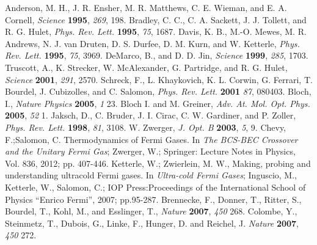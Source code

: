 \documentclass[atoms,article,submit,moreauthors,pdftex,12pt,a4paper]{mdpi}
\begin{document}

\makeatletter
\renewcommand\@biblabel[1]{#1. }
\makeatother
\begin{thebibliography}{999} %
Anderson, M. H., J. R. Ensher, M. R. Matthews, C. E. Wieman, and E. A. Cornell, {\em Science} {\bf 1995}, {\em 269}, 198.
Bradley, C. C., C. A. Sackett, J. J. Tollett, and R. G. Hulet, {\em Phys. Rev. Lett.} {\bf 1995}, {\em 75}, 1687.
Davis, K. B., M.-O. Mewes, M. R. Andrews, N. J. van Druten, D. S. Durfee, D. M. Kurn, and W. Ketterle, {\em Phys. Rev. Lett.} {\bf 1995}, {\em 75}, 3969.
DeMarco, B., and D. D. Jin, {\em Science} {\bf 1999}, {\em 285}, 1703.
Truscott, A., K. Strecker, W. McAlexander, G. Partridge, and R. G. Hulet, {\em Science} {\bf 2001}, {\em 291}, 2570.
Schreck, F., L. Khaykovich, K. L. Corwin, G. Ferrari, T. Bourdel, J. Cubizolles, and C. Salomon, {\em Phys. Rev. Lett.} {\bf 2001} {\em 87}, 080403.
Bloch, I., {\em Nature Physics} {\bf 2005}, {\em 1} 23. 
Bloch I. and M. Greiner, {\em Adv. At. Mol. Opt. Phys.} {\bf 2005}, {\em 52} 1.
Jaksch, D., C. Bruder, J. I. Cirac, C. W. Gardiner, and P. Zoller, {\em Phys. Rev. Lett.} {\bf 1998}, {\em 81}, 3108.
W. Zwerger, {\em J. Opt. B} {\bf 2003}, {\em 5}, 9.
Chevy, F.;Salomon, C. Thermodynamics of Fermi Gases. In {\em The BCS-BEC Crossover and the Unitary Fermi Gas}; Zwerger, W.; Springer: Lecture Notes in Physics, Vol. 836, 2012; pp. 407-446.
Ketterle, W.; Zwierlein, M. W., Making, probing and understanding ultracold Fermi gases. In {\em Ultra-cold Fermi Gases}; Inguscio, M., Ketterle, W., Salomon, C.; IOP Press:Proceedings of the International School of Physics ``Enrico Fermi'', 2007; pp.95-287.
Brennecke, F., Donner, T., Ritter, S., Bourdel, T., Kohl, M., and Esslinger, T., {\em Nature} {\bf 2007}, {\em 450} 268.
Colombe, Y., Steinmetz, T., Dubois, G., Linke, F., Hunger, D. and Reichel, J. {\em Nature} {\bf 2007}, {\em 450} 272.

\end{thebibliography}
\end{document}
